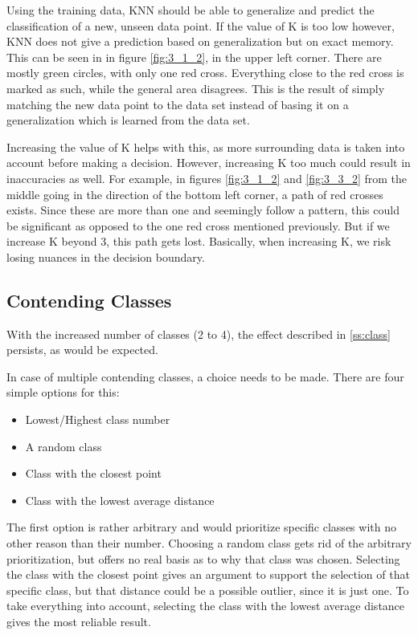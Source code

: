 \documentclass[10pt,a4paper]{article}
\begin{document}
Using the training data, KNN should be able to generalize and predict the classification of a new, unseen data point. If the value of K is too low however, KNN does not give a prediction based on generalization but on exact memory. This can be seen in in figure \ref{fig:3_1_2}, in the upper left corner. There are mostly green circles, with only one red cross. Everything close to the red cross is marked as such, while the general area disagrees. This is the result of simply matching the new data point to the data set instead of basing it on a generalization which is learned from the data set.

Increasing the value of K helps with this, as more surrounding data is taken into account before making a decision. However, increasing K too much could result in inaccuracies as well. For example, in figures \ref{fig:3_1_2} and \ref{fig:3_3_2} from the middle going in the direction of the bottom left corner, a path of red crosses exists. Since these are more than one and seemingly follow a pattern, this could be significant as opposed to the one red cross mentioned previously. But if we increase K beyond 3, this path gets lost. Basically, when increasing K, we risk losing nuances in the decision boundary.

\subsection{Contending Classes}
With the increased number of classes (2 to 4), the effect described in \ref{ss:class} persists, as would be expected.

In case of multiple contending classes, a choice needs to be made. There are four simple options for this:
\begin{itemize}
\item Lowest/Highest class number
\item A random class
\item Class with the closest point
\item Class with the lowest average distance
\end{itemize}

The first option is rather arbitrary and would prioritize specific classes with no other reason than their number. Choosing a random class gets rid of the arbitrary prioritization, but offers no real basis as to why that class was chosen.
Selecting the class with the closest point gives an argument to support the selection of that specific class, but that distance could be a possible outlier, since it is just one. To take everything into account, selecting the class with the lowest average distance gives the most reliable result.
\end{document}
